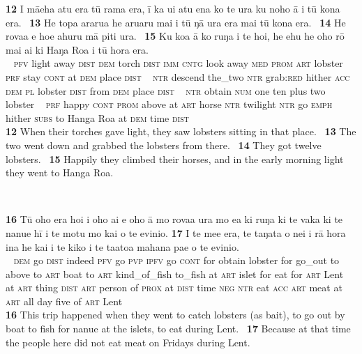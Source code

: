 \bigskip\gll
\textbf{\textup{12}} I mā{\ꞌ}eha atu era tū rama era, {\ꞌ}ī ka u{\ꞌ}i atu ena ko te {\ꞌ}ura ku noho {\ꞌ}ā {\ꞌ}i tū kona era. ~\textbf{\textup{13}} He topa ararua he {\ꞌ}aru{\ꞌ}aru mai i tū ŋā {\ꞌ}ura era mai tū kona era. ~\textbf{\textup{14}} He rova{\ꞌ}a e ho{\ꞌ}e {\ꞌ}ahuru mā piti {\ꞌ}ura. ~\textbf{\textup{15}} Ku koa {\ꞌ}ā ko ruŋa i te hoi, he {\ꞌ}ehu he oho rō mai {\ꞌ}ai ki Haŋa Roa {\ꞌ}i tū hora era.\\
~ \textsc{pfv} light away \textsc{dist} \textsc{dem} torch \textsc{dist} \textsc{imm} \textsc{cntg} look away \textsc{med} \textsc{prom} \textsc{art} lobster \textsc{prf} stay \textsc{cont} at \textsc{dem} place \textsc{dist} ~ \textsc{ntr} descend the\_two \textsc{ntr} grab:\textsc{red} hither \textsc{acc} \textsc{dem} \textsc{pl} lobster \textsc{dist} from \textsc{dem} place \textsc{dist} ~ \textsc{ntr} obtain \textsc{num} one ten plus two lobster ~ \textsc{prf} happy \textsc{cont} \textsc{prom} above at \textsc{art} horse \textsc{ntr} twilight \textsc{ntr} go \textsc{emph} hither \textsc{subs} to Hanga Roa at \textsc{dem} time \textsc{dist}\\

\medskip\glt
\textbf{\textup{12}} When their torches gave light, they saw lobsters sitting in that place. ~\textbf{\textup{13}} The two went down and grabbed the lobsters from there. ~\textbf{\textup{14}} They got twelve lobsters. ~\textbf{\textup{15}} Happily they climbed their horses, and in the early morning light they went to Hanga Roa.


~

\bigskip\gll
\textbf{\textup{16}} Tū oho era ho{\ꞌ}i i oho ai e oho {\ꞌ}ā mo rova{\ꞌ}a {\ꞌ}ura mo e{\ꞌ}a ki ruŋa ki te vaka ki te nanue hī {\ꞌ}i te motu mo kai o te evinio. \textbf{\textup{17}} {\ꞌ}I te me{\ꞌ}e era, te taŋata o nei {\ꞌ}i rā hora {\ꞌ}ina he kai i te kiko {\ꞌ}i te ta{\ꞌ}ato{\ꞌ}a mahana pae o te evinio.\\
~ \textsc{dem} go \textsc{dist} indeed \textsc{pfv} go \textsc{pvp} \textsc{ipfv} go \textsc{cont} for obtain lobster for go\_out to above to \textsc{art} boat to \textsc{art} kind\_of\_fish to\_fish at \textsc{art} islet for eat for \textsc{art} Lent  ~ at \textsc{art} thing \textsc{dist} \textsc{art} person of \textsc{prox} at \textsc{dist} time \textsc{neg} \textsc{ntr} eat \textsc{acc} \textsc{art} meat at \textsc{art} all day five of \textsc{art} Lent\\

\medskip\glt
\textbf{\textup{16}} This trip happened when they went to catch lobsters (as bait), to go out by boat to fish for nanue at the islets, to eat during Lent. ~\textbf{\textup{17}} Because at that time the people here did not eat meat on Fridays during Lent.

